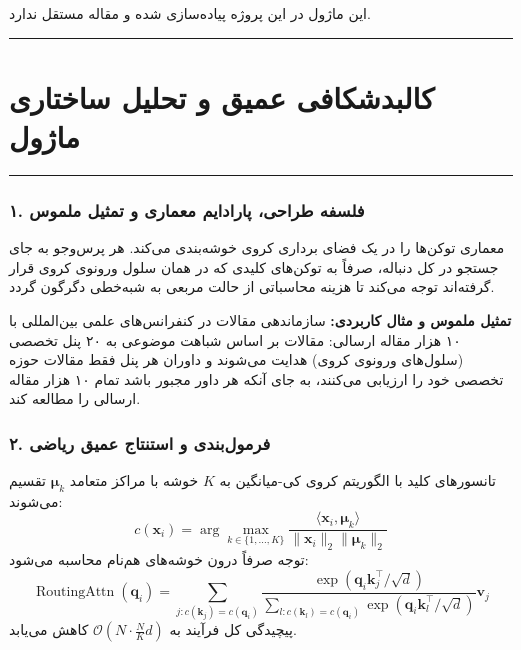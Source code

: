\clearpage
{}
\vspace*{0.2cm}

این ماژول در این پروژه پیاده‌سازی شده و مقاله مستقل ندارد.
\noindent\rule{\textwidth}{1.2pt}
\vspace*{0.1cm}
\section{کالبدشکافی عمیق و تحلیل ساختاری ماژول }
\label{sec:mod_routing_attention}
\vspace*{-0.2cm}
\noindent\rule{\textwidth}{0.5pt}
\vspace*{0.3cm}

\subsubsection*{۱. فلسفه طراحی، پارادایم معماری و تمثیل ملموس}
معماری  توکن‌ها را در یک فضای برداری کروی خوشه‌بندی می‌کند. هر پرس‌وجو به جای جستجو در کل دنباله، صرفاً به توکن‌های کلیدی که در همان سلول ورونوی کروی قرار گرفته‌اند توجه می‌کند تا هزینه محاسباتی از حالت مربعی به شبه‌خطی دگرگون گردد.

\textbf{تمثیل ملموس و مثال کاربردی:}
سازماندهی مقالات در کنفرانس‌های علمی بین‌المللی با ۱۰ هزار مقاله ارسالی: مقالات بر اساس شباهت موضوعی به ۲۰ پنل تخصصی (سلول‌های ورونوی کروی) هدایت می‌شوند و داوران هر پنل فقط مقالات حوزه تخصصی خود را ارزیابی می‌کنند، به جای آنکه هر داور مجبور باشد تمام ۱۰ هزار مقاله ارسالی را مطالعه کند.

\subsubsection*{۲. فرمول‌بندی و استنتاج عمیق ریاضی }
تانسورهای کلید با الگوریتم کروی کی-میانگین  به $K$ خوشه با مراکز متعامد $\boldsymbol{\mu}_k$ تقسیم می‌شوند:
\begin{equation}
c(\mathbf{x}_i) = \arg\max_{k \in \{1, \dots, K\}} \frac{\langle \mathbf{x}_i, \boldsymbol{\mu}_k \rangle}{\|\mathbf{x}_i\|_2 \|\boldsymbol{\mu}_k\|_2}
\end{equation}
توجه صرفاً درون خوشه‌های هم‌نام محاسبه می‌شود:
\begin{equation}
\operatorname{RoutingAttn}(\mathbf{q}_i) = \sum_{j: c(\mathbf{k}_j) = c(\mathbf{q}_i)} \frac{\exp(\mathbf{q}_i \mathbf{k}_j^\top / \sqrt{d})}{\sum_{l: c(\mathbf{k}_l) = c(\mathbf{q}_i)} \exp(\mathbf{q}_i \mathbf{k}_l^\top / \sqrt{d})} \mathbf{v}_j
\end{equation}
پیچیدگی کل فرآیند به $\mathcal{O}(N \cdot \frac{N}{K} d)$ کاهش می‌یابد.

